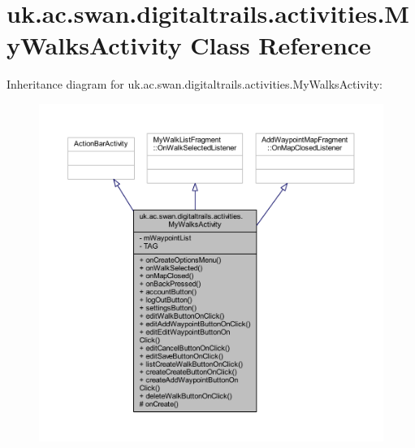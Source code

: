 \hypertarget{classuk_1_1ac_1_1swan_1_1digitaltrails_1_1activities_1_1_my_walks_activity}{\section{uk.\+ac.\+swan.\+digitaltrails.\+activities.\+My\+Walks\+Activity Class Reference}
\label{classuk_1_1ac_1_1swan_1_1digitaltrails_1_1activities_1_1_my_walks_activity}
}


Inheritance diagram for uk.\+ac.\+swan.\+digitaltrails.\+activities.\+My\+Walks\+Activity\+:
\nopagebreak
\begin{figure}[H]
\begin{center}
\leavevmode
\includegraphics[width=350pt]{classuk_1_1ac_1_1swan_1_1digitaltrails_1_1activities_1_1_my_walks_activity__inherit__graph}
\end{center}
\end{figure}


